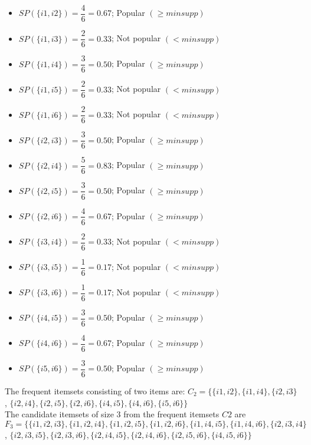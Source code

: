 \begin{itemize}
\item \(SP(\{i1,i2\})=\dfrac{4}{6}=0.67\); Popular \((\geq minsupp)\)
\item \(SP(\{i1,i3\})=\dfrac{2}{6}=0.33\); Not popular  \((< minsupp)\)
\item \(SP(\{i1,i4\})=\dfrac{3}{6}=0.50\); Popular  \((\geq minsupp)\)
\item \(SP(\{i1,i5\})=\dfrac{2}{6}=0.33\); Not popular  \((< minsupp)\)
\item \(SP(\{i1,i6\})=\dfrac{2}{6}=0.33\); Not popular  \((< minsupp)\)
\item \(SP(\{i2,i3\})=\dfrac{3}{6}=0.50\); Popular \((\geq minsupp)\)
\item \(SP(\{i2,i4\})=\dfrac{5}{6}=0.83\); Popular  \((\geq minsupp)\)
\item \(SP(\{i2,i5\})=\dfrac{3}{6}=0.50\); Popular  \((\geq minsupp)\)
\item \(SP(\{i2,i6\})=\dfrac{4}{6}=0.67\); Popular  \((\geq minsupp)\)
\item \(SP(\{i3,i4\})=\dfrac{2}{6}=0.33\); Not popular  \((< minsupp)\)
\item \(SP(\{i3,i5\})=\dfrac{1}{6}=0.17\); Not popular  \((< minsupp)\)
\item \(SP(\{i3,i6\})=\dfrac{1}{6}=0.17\); Not popular  \((< minsupp)\)
\item \(SP(\{i4,i5\})=\dfrac{3}{6}=0.50\); Popular  \((\geq minsupp)\)
\item \(SP(\{i4,i6\})=\dfrac{4}{6}=0.67\); Popular  \((\geq minsupp)\)
\item \(SP(\{i5,i6\})=\dfrac{3}{6}=0.50\); Popular  \((\geq minsupp)\)
\end{itemize}
The frequent itemsets consisting of two items are: \(C_2=\{\{i1,i2\},\{i1,i4\},\{i2,i3\}\) , \(\{i2,i4\},\{i2,i5\},\{i2,i6\},\{i4,i5\},\{i4,i6\},\{i5,i6\}\}\)\\
The candidate itemsets of size 3 from the frequent itemsets \(C2\) are\\ \(F_3=\{\{i1,i2,i3\},\{i1,i2,i4\},\{i1,i2,i5\},\{i1,i2,i6\},\{i1,i4,i5\},\{i1,i4,i6\},\{i2,i3,i4\}\) , \(\{i2,i3,i5\},\{i2,i3,i6\},\{i2,i4,i5\},\{i2,i4,i6\},\{i2,i5,i6\},\{i4,i5,i6\}\}\)
